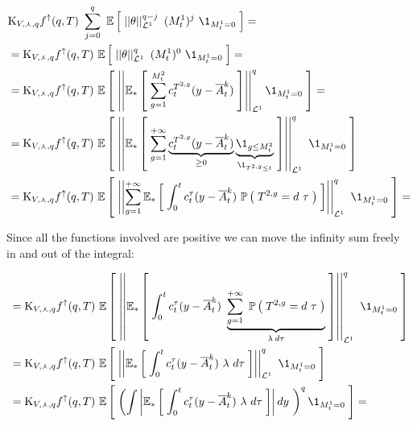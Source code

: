 	\begin{align*}
		&\const_{\attraction,\curlywedge,q}\Fup(q,T)\
		\sum_{j=0}^{q}\
		\E{
			\Norm{
				\theta
			}_{\Lpspace^1}^{q-j}\
			(\hmactive_t^1)^j\
			\1_{\hmactive_t^1 = 0}			
		} =
		\\
		&=\const_{\attraction,\curlywedge,q}
		\Fup(q,T)\
		\E{
			\Norm{
				\theta
			}_{\Lpspace^1}^q\
			(\hmactive_t^1)^0\
			\1_{\hmactive_t^1 = 0}			
		} =
		\\
		&=\const_{\attraction,\curlywedge,q}\Fup(q,T)\
		\E{
			\Norm{
				\EFoot
				{\ast}{
					\sum _{g = 1}^{\hmactive_t^2}
					\cdens_t^{\btime^{2,g}}
					(y - \mfamba_t^k)
				}
			}_{\Lpspace^1}^q
			\1_{\hmactive_t^1 = 0}			
		} =
		\\
		&=
		\const_{\attraction,\curlywedge,q}\Fup(q,T)\
		\E{
			\Norm{
				\EFoot
				{\ast}{
					\sum _{g = 1}^{+\infty}
					\underbrace{
						\cdens_t^{\btime^{2,g}}
						(y - \mfamba_t^k)
					}_{\geq 0}
					\underbrace{
						\1_{g \leq \hmactive_t^2}
					}_{
						\1_{\btime^{2,g} \leq t}
					}
				}
			}_{\Lpspace^1}^q\
			\1_{\hmactive_t^1 = 0}			
		}
		\\
		&=
		\const_{\attraction,\curlywedge,q}\Fup(q,T)\
		\E{
			\Norm{
				\sum _{g = 1}^{+\infty}
				\EFoot
				{\ast}{
					\int_0^t
					\cdens_t^{\tau}
					(y - \mfamba_t^k)\
					\PrbOf{\btime^{2,g} = d\ \tau}
				}
			}_{\Lpspace^1}^q\
			\1_{\hmactive_t^1 = 0}			
		}=
	\end{align*}
	
	Since all the functions involved are positive we can move the infinity sum freely in and out of the integral:
	
	\begin{align*}
		&=		
		\const_{\attraction,\curlywedge,q}\Fup(q,T)\
		\E{
			\Norm{
				\EFoot
				{\ast}{
					\int_0^t
					\cdens_t^{\tau}
					(y - \mfamba_t^k)\
					\underbrace{
						\sum _{g = 1}^{+\infty}\
						\PrbOf{\btime^{2,g} = d\ \tau}
					}_{
						\lambda\:d\tau
					}
				}
			}_{\Lpspace^1}^q\
			\1_{\hmactive_t^1 = 0}			
		}
		\\
		&=				
		\const_{\attraction,\curlywedge,q}\Fup(q,T)\
		\E{
			\Norm{
				\EFoot
				{\ast}{
					\int_0^t
					\cdens_t^{\tau}
					(y - \mfamba_t^k)\
					\lambda\
					d\tau
				}
			}_{\Lpspace^1}^q\
			\1_{\hmactive_t^1 = 0}			
		}
		\\
		&=
		\const_{\attraction,\curlywedge,q}\Fup(q,T)\
		\E{
			\left(
			\int
			\norm{
				\EFoot
				{\ast}{
					\int_0^t
					\cdens_t^{\tau}
					(y - \mfamba_t^k)\
					\lambda\
					d\tau
				}
			}
			dy\
			\right)^q
			\1_{\hmactive_t^1 = 0}			
		}=
	\end{align*}
	
